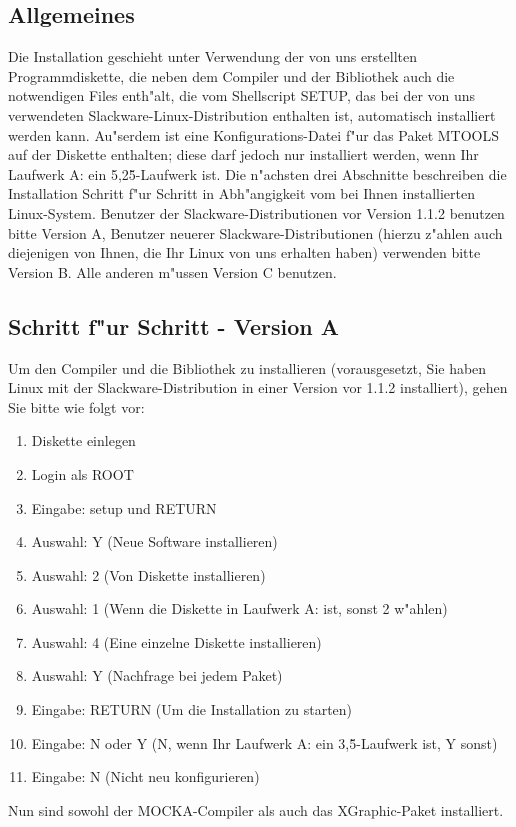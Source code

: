 \subsection{Allgemeines}
Die Installation geschieht unter Verwendung der von uns erstellten
Programmdiskette, die neben dem Compiler und der Bibliothek auch die
notwendigen Files enth"alt, die vom Shellscript SETUP, das bei der von uns
verwendeten Slackware-Linux-Distribution enthalten ist, automatisch
installiert werden kann. Au"serdem ist eine Konfigurations-Datei f"ur
das Paket MTOOLS auf der Diskette enthalten; diese darf jedoch nur
installiert werden, wenn Ihr Laufwerk A: ein 5,25\"\/-Laufwerk ist.
Die n"achsten drei Abschnitte beschreiben die Installation Schritt f"ur
Schritt in Abh"angigkeit vom bei Ihnen installierten Linux-System. Benutzer
der Slackware-Distributionen vor Version 1.1.2 benutzen bitte Version A,
Benutzer neuerer Slackware-Distributionen (hierzu z"ahlen auch diejenigen von
Ihnen, die Ihr Linux von uns erhalten haben) verwenden bitte Version B. Alle
anderen m"ussen Version C benutzen.




\subsection{Schritt f"ur Schritt - Version A}
Um den Compiler und die Bibliothek zu installieren (vorausgesetzt, Sie
haben Linux mit der Slackware-Distribution in einer Version vor 1.1.2
installiert), gehen Sie bitte wie folgt vor:

\begin{enumerate}
  \item{Diskette einlegen}
  \item{Login als ROOT}
  \item{Eingabe: setup und RETURN}
  \item{Auswahl: Y (Neue Software installieren)}
  \item{Auswahl: 2 (Von Diskette installieren)}
  \item{Auswahl: 1 (Wenn die Diskette in Laufwerk A: ist, sonst 2 w"ahlen)}
  \item{Auswahl: 4 (Eine einzelne Diskette installieren)}
  \item{Auswahl: Y (Nachfrage bei jedem Paket)}
  \item{Eingabe: RETURN (Um die Installation zu starten)}
  \item{Eingabe: N oder Y (N, wenn Ihr Laufwerk A: ein 3,5\"\/-Laufwerk ist, Y
        sonst)}
  \item{Eingabe: N (Nicht neu konfigurieren)}
\end{enumerate}
Nun sind sowohl der MOCKA-Compiler als auch das XGraphic-Paket installiert.



